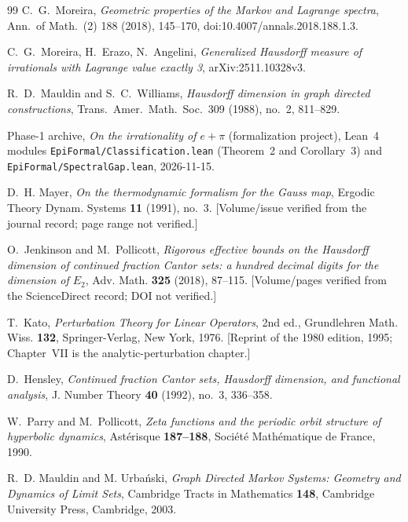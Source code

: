 \begin{thebibliography}{99}
 C.~G.~Moreira, \emph{Geometric properties of the Markov and
Lagrange spectra}, Ann.\ of Math.\ (2) 188 (2018), 145--170,
doi:10.4007/\allowbreak annals.2018.188.1.3.

 C.~G.~Moreira, H.~Erazo, N.~Angelini,
\emph{Generalized Hausdorff measure of irrationals with Lagrange value exactly 3},
arXiv:2511.10328v3.

{\sloppy
{} R.~D.~Mauldin and S.~C.~Williams,
\emph{Hausdorff dimension in graph directed constructions},
Trans.~Amer.~Math.~Soc.~309 (1988), no.~2, 811--829.
}

 Phase-1 archive, \emph{On the irrationality of $e+\pi$}
(formalization project), Lean~4 modules \texttt{EpiFormal/\allowbreak Classification.lean}
(Theorem~2 and Corollary~3) and \texttt{EpiFormal/\allowbreak Spectral\allowbreak Gap.lean}, 2026-11-15.


 D.~H. Mayer, \emph{On the thermodynamic formalism for the
Gauss map}, Ergodic Theory Dynam. Systems \textbf{11} (1991), no.~3.
[Volume/issue verified from the journal record; page range not verified.]

 O.~Jenkinson and M.~Pollicott, \emph{Rigorous
effective bounds on the Hausdorff dimension of continued fraction Cantor sets:
a hundred decimal digits for the dimension of $E_2$}, Adv. Math.
\textbf{325} (2018), 87--115. [Volume/pages verified from the ScienceDirect
record; DOI not verified.]

 T.~Kato, \emph{Perturbation Theory for Linear Operators},
2nd ed., Grundlehren Math. Wiss. \textbf{132}, Springer-Verlag, New York, 1976.
[Reprint of the 1980 edition, 1995; Chapter~VII is the analytic-perturbation
chapter.]

 D.~Hensley, \emph{Continued fraction Cantor sets,
Hausdorff dimension, and functional analysis}, J. Number Theory \textbf{40}
(1992), no.~3, 336--358.

 W.~Parry and M.~Pollicott, \emph{Zeta functions and
the periodic orbit structure of hyperbolic dynamics}, Ast\'erisque
\textbf{187--188}, Soci\'et\'e Math\'ematique de France, 1990.

 R.~D. Mauldin and M. Urba\'nski, \emph{Graph
Directed Markov Systems: Geometry and Dynamics of Limit Sets}, Cambridge Tracts
in Mathematics \textbf{148}, Cambridge University Press, Cambridge, 2003.

\end{thebibliography}
